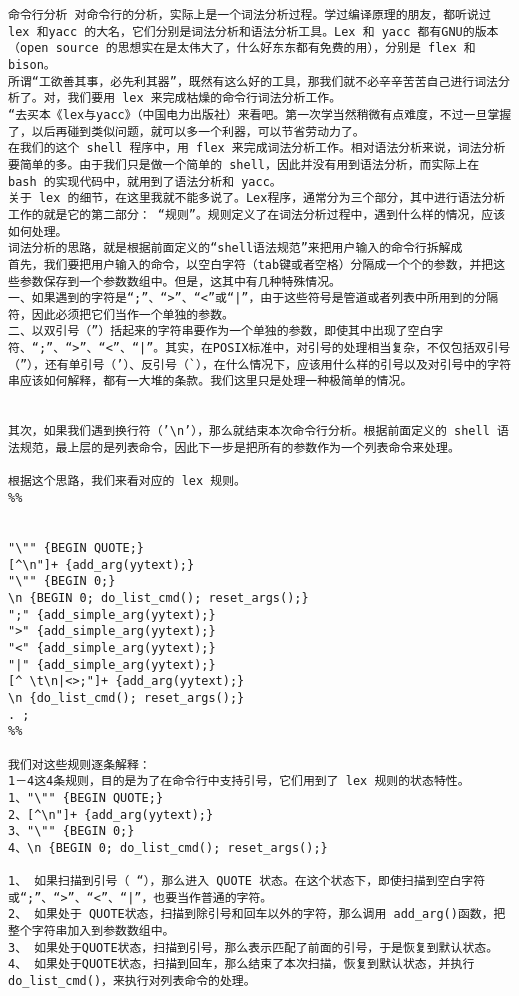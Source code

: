 \begin{lstlisting}
命令行分析 对命令行的分析，实际上是一个词法分析过程。学过编译原理的朋友，都听说过 lex 和yacc 的大名，它们分别是词法分析和语法分析工具。Lex 和 yacc 都有GNU的版本（open source 的思想实在是太伟大了，什么好东东都有免费的用），分别是 flex 和 bison。 
所谓“工欲善其事，必先利其器”，既然有这么好的工具，那我们就不必辛辛苦苦自己进行词法分析了。对，我们要用 lex 来完成枯燥的命令行词法分析工作。 
“去买本《lex与yacc》（中国电力出版社）来看吧。第一次学当然稍微有点难度，不过一旦掌握了，以后再碰到类似问题，就可以多一个利器，可以节省劳动力了。 
在我们的这个 shell 程序中，用 flex 来完成词法分析工作。相对语法分析来说，词法分析要简单的多。由于我们只是做一个简单的 shell，因此并没有用到语法分析，而实际上在 bash 的实现代码中，就用到了语法分析和 yacc。 
关于 lex 的细节，在这里我就不能多说了。Lex程序，通常分为三个部分，其中进行语法分析工作的就是它的第二部分： “规则”。规则定义了在词法分析过程中，遇到什么样的情况，应该如何处理。 
词法分析的思路，就是根据前面定义的“shell语法规范”来把用户输入的命令行拆解成 
首先，我们要把用户输入的命令，以空白字符（tab键或者空格）分隔成一个个的参数，并把这些参数保存到一个参数数组中。但是，这其中有几种特殊情况。 
一、如果遇到的字符是“;”、“>”、“<”或“|”，由于这些符号是管道或者列表中所用到的分隔符，因此必须把它们当作一个单独的参数。 
二、以双引号（”）括起来的字符串要作为一个单独的参数，即使其中出现了空白字符、“;”、“>”、“<”、“|”。其实，在POSIX标准中，对引号的处理相当复杂，不仅包括双引号（”），还有单引号（’）、反引号（`），在什么情况下，应该用什么样的引号以及对引号中的字符串应该如何解释，都有一大堆的条款。我们这里只是处理一种极简单的情况。 


其次，如果我们遇到换行符（’\n’），那么就结束本次命令行分析。根据前面定义的 shell 语法规范，最上层的是列表命令，因此下一步是把所有的参数作为一个列表命令来处理。 

根据这个思路，我们来看对应的 lex 规则。 
%% 


"\"" {BEGIN QUOTE;} 
[^\n"]+ {add_arg(yytext);} 
"\"" {BEGIN 0;} 
\n {BEGIN 0; do_list_cmd(); reset_args();} 
";" {add_simple_arg(yytext);} 
">" {add_simple_arg(yytext);} 
"<" {add_simple_arg(yytext);} 
"|" {add_simple_arg(yytext);} 
[^ \t\n|<>;"]+ {add_arg(yytext);} 
\n {do_list_cmd(); reset_args();} 
. ; 
%% 

我们对这些规则逐条解释： 
1－4这4条规则，目的是为了在命令行中支持引号，它们用到了 lex 规则的状态特性。 
1、"\"" {BEGIN QUOTE;} 
2、[^\n"]+ {add_arg(yytext);} 
3、"\"" {BEGIN 0;} 
4、\n {BEGIN 0; do_list_cmd(); reset_args();} 

1、 如果扫描到引号（ “），那么进入 QUOTE 状态。在这个状态下，即使扫描到空白字符或“;”、“>”、“<”、“|”，也要当作普通的字符。 
2、 如果处于 QUOTE状态，扫描到除引号和回车以外的字符，那么调用 add_arg()函数，把整个字符串加入到参数数组中。 
3、 如果处于QUOTE状态，扫描到引号，那么表示匹配了前面的引号，于是恢复到默认状态。 
4、 如果处于QUOTE状态，扫描到回车，那么结束了本次扫描，恢复到默认状态，并执行 do_list_cmd()，来执行对列表命令的处理。 



\end{lstlisting}
